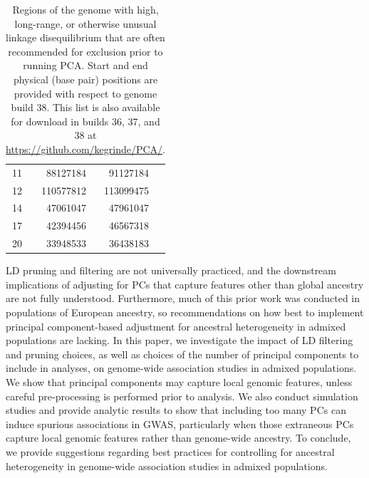 \documentclass[12pt]{article}
\begin{document}
\begin{table}
\begin{tabular}{crrl}
11   & 88127184    &    91127184   &    \citep{weale2010, price2008, anderson2010}  \\
12   & 110577812   &    113099475   &    \citep{weale2010, price2008} \\
14   & 47061047    &    47961047   &    \citep{prive2018} \\
17   & 42394456    &    46567318    &   \citep{conomos2016, novembre2008} \\
20   & 33948533   &     36438183    &   \citep{weale2010, price2008, anderson2010}  \\
\end{tabular}
\caption{Regions of the genome with high, long-range, or otherwise unusual linkage disequilibrium that are often recommended for exclusion prior to running PCA. Start and end physical (base pair) positions are provided with respect to genome build 38. This list is also available for download in builds 36, 37, and 38 at \href{github.com/kegrinde/PCA}{https://github.com/kegrinde/PCA/}.}
\label{tab:highLD}
\end{table}


LD pruning and filtering are not universally practiced, and the downstream implications of adjusting for PCs that capture features other than global ancestry are not fully understood.
Furthermore, much of this prior work was conducted in populations of European ancestry, so recommendations on how best to implement principal component-based adjustment for ancestral heterogeneity in admixed populations are lacking. 
In this paper, we investigate the impact of LD filtering and pruning choices, as well as choices of the number of principal components to include in analyses, on genome-wide association studies in admixed populations.
We show that principal components may capture local genomic features, unless careful pre-processing is performed prior to analysis.
We also conduct simulation studies and provide analytic results to show that including too many PCs can induce spurious associations in GWAS, particularly when those extraneous PCs capture local genomic features rather than genome-wide ancestry.
To conclude, we provide suggestions regarding best practices for  controlling for ancestral heterogeneity in genome-wide association studies in admixed populations.
\end{document}
